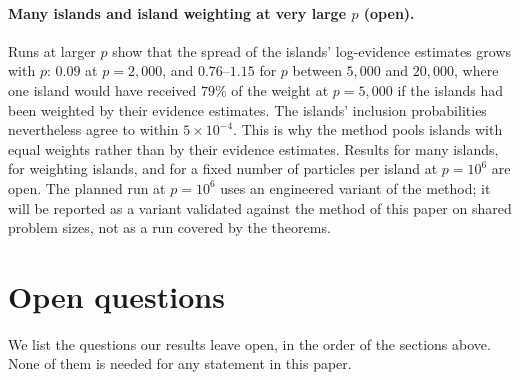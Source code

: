 \paragraph{Many islands and island weighting at very large $p$ (open).} Runs at larger $p$ show that the spread of the
islands' log-evidence estimates grows with $p$: $0.09$ at $p=2{,}000$, and $0.76$--$1.15$ for $p$ between $5{,}000$ and
$20{,}000$, where one island would have received $79\%$ of the weight at $p=5{,}000$ if the islands had been weighted by their
evidence estimates. The islands' inclusion probabilities
nevertheless agree to within $5\times10^{-4}$. This is why the method pools islands with equal weights rather than by
their evidence estimates. Results for many islands, for weighting islands, and for a fixed number of particles per
island at $p=10^6$ are open. The planned run at $p=10^6$ uses an engineered variant of the method; it will be reported as
a variant validated against the method of this paper on shared problem sizes, not as a run covered by the theorems.


\section{Open questions}\label{sec:open}

We list the questions our results leave open, in the order of the sections above. None of them is needed for any
statement in this paper.

